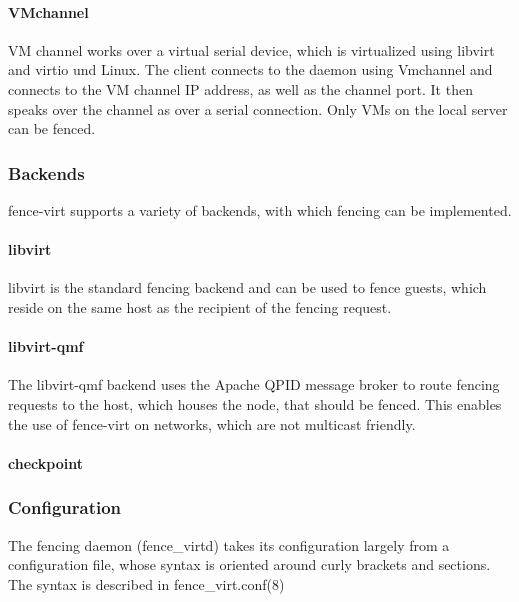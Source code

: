 \paragraph{VMchannel}
VM channel works over a virtual serial device, which is virtualized using libvirt and
virtio und Linux.
The client connects to the daemon using Vmchannel and connects to the VM channel IP address,
as well as the channel port. It then speaks over the channel as over a serial connection.
Only \acp{VM} on the local server can be fenced.
\subsubsection{Backends}
fence-virt supports a variety of backends, with which fencing can be implemented.
\paragraph{libvirt}
libvirt is the standard fencing backend and can be used to fence guests, which
reside on the same host as the recipient of the fencing request.
\paragraph{libvirt-qmf}
The libvirt-qmf backend uses the Apache QPID message broker to route fencing
requests to the host, which houses the node, that should be fenced. This
enables the use of fence-virt on networks, which are not multicast friendly.
\paragraph{checkpoint}
\subsubsection{Configuration}
The fencing daemon (fence\_virtd) takes its configuration largely from
a configuration file, whose syntax is oriented around curly brackets and 
sections. The syntax is described in fence\_virt.conf(8)
